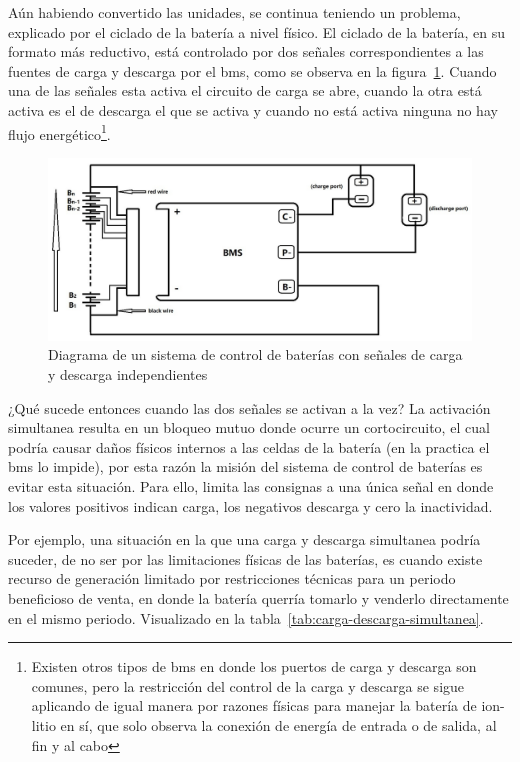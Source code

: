 Aún habiendo convertido las unidades, se continua teniendo un problema, explicado por el ciclado de la batería a nivel físico. El ciclado de la batería, en su formato más reductivo, está controlado por dos señales correspondientes a las fuentes de carga y descarga por el \gls{bms}, como se observa en la figura~\ref{fig:carga-descarga}. Cuando una de las señales esta activa el circuito de carga se abre, cuando la otra está activa es el de descarga el que se activa y cuando no está activa ninguna no hay flujo energético\footnote{Existen otros tipos de \gls{bms} en donde los puertos de carga y descarga son comunes, pero la restricción del control de la carga y descarga se sigue aplicando de igual manera por razones físicas para manejar la batería de ion-litio en sí, que solo observa la conexión de energía de entrada o de salida, al fin y al cabo}.

\begin{figure}
  \centering
  \includegraphics[width=0.5\linewidth]{figures/carga-descarga.png}
  \caption{Diagrama de un sistema de control de baterías con señales de carga y descarga independientes~\cite{sunkko2025two}}
  \label{fig:carga-descarga}
\end{figure}

¿Qué sucede entonces cuando las dos señales se activan a la vez? La activación simultanea resulta en un bloqueo mutuo donde ocurre un cortocircuito, el cual podría causar daños físicos internos a las celdas de la batería (en la practica el \gls{bms} lo impide), por esta razón la misión del sistema de control de baterías es evitar esta situación. Para ello, limita las consignas a una única señal en donde los valores positivos indican carga, los negativos descarga y cero la inactividad.

Por ejemplo, una situación en la que una carga y descarga simultanea podría suceder, de no ser por las limitaciones físicas de las baterías, es cuando existe recurso de generación limitado por restricciones técnicas para un periodo beneficioso de venta, en donde la batería querría tomarlo y venderlo directamente en el mismo periodo. Visualizado en la tabla~\ref{tab:carga-descarga-simultanea}.

